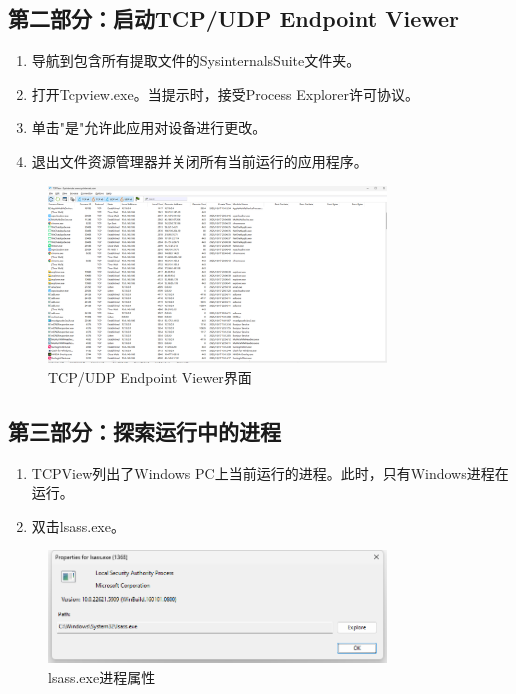 \documentclass[12pt,a4paper]{article}
\begin{document}
\subsection{第二部分：启动TCP/UDP Endpoint Viewer}

\begin{enumerate}
    \item 导航到包含所有提取文件的SysinternalsSuite文件夹。
    \item 打开Tcpview.exe。当提示时，接受Process Explorer许可协议。
    \item 单击"是"允许此应用对设备进行更改。
    \item 退出文件资源管理器并关闭所有当前运行的应用程序。
\end{enumerate}

\begin{figure}[H]
    \centering
    \includegraphics[width=0.8\textwidth]{TcpView.png}
    \caption{TCP/UDP Endpoint Viewer界面}
    \label{fig:tcpview}
\end{figure}

\subsection{第三部分：探索运行中的进程}

\begin{enumerate}
    \item TCPView列出了Windows PC上当前运行的进程。此时，只有Windows进程在运行。
    \item 双击lsass.exe。
\end{enumerate}

\begin{figure}[H]
    \centering
    \includegraphics[width=0.8\textwidth]{lssas.png}
    \caption{lsass.exe进程属性}
    \label{fig:lsass}
\end{figure}
\end{document}
